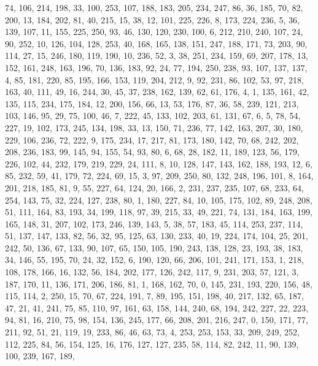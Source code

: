 \begin{DoxyCode}
       74, 106, 214, 198, 33, 100, 253, 107, 188, 183, 205, 234, 247, 86, 36, 185, 70, 82, 200, 13, 184, 202, 81, 40,
       215, 15, 38, 12, 101, 225, 226, 8, 173, 224, 236, 5, 36, 139, 107, 11, 155, 225, 250, 93, 46, 130, 120,
       230, 100, 6, 212, 210, 240, 107, 24, 90, 252, 10, 126, 104, 128, 253, 40, 168, 165, 138, 151, 247, 188, 171,
       73, 203, 90, 114, 27, 15, 246, 180, 119, 190, 10, 236, 52, 3, 38, 251, 234, 159, 69, 207, 178, 13, 152, 161,
       248, 163, 196, 70, 136, 183, 92, 24, 77, 194, 250, 238, 93, 107, 137, 137, 4, 85, 181, 220, 85, 195, 166,
       153, 119, 204, 212, 9, 92, 231, 86, 102, 53, 97, 218, 163, 40, 111, 49, 16, 244, 30, 45, 37, 238, 162, 139, 62,
       61, 176, 4, 1, 135, 161, 42, 135, 115, 234, 175, 184, 12, 200, 156, 66, 13, 53, 176, 87, 36, 58, 239, 121,
       213, 103, 146, 95, 29, 75, 100, 46, 7, 222, 45, 133, 102, 203, 61, 131, 67, 6, 5, 78, 54, 227, 19, 102, 173,
       245, 134, 198, 33, 13, 150, 71, 236, 77, 142, 163, 207, 30, 180, 229, 106, 236, 72, 222, 9, 175, 234, 17,
       217, 81, 173, 180, 142, 70, 68, 242, 202, 208, 236, 183, 99, 145, 94, 155, 54, 93, 80, 6, 68, 28, 182, 11,
       189, 123, 56, 179, 226, 102, 44, 232, 179, 219, 229, 24, 111, 8, 10, 128, 147, 143, 162, 188, 193, 12, 6, 85,
       232, 59, 41, 179, 72, 224, 69, 15, 3, 97, 209, 250, 80, 132, 248, 196, 101, 8, 164, 201, 218, 185, 81, 9,
       55, 227, 64, 124, 20, 166, 2, 231, 237, 235, 107, 68, 233, 64, 254, 143, 75, 32, 224, 127, 238, 80, 1, 180,
       227, 84, 10, 105, 175, 102, 89, 248, 208, 51, 111, 164, 83, 193, 34, 199, 118, 97, 39, 215, 33, 49, 221, 74,
       131, 184, 163, 199, 165, 148, 31, 207, 102, 173, 246, 139, 143, 5, 38, 57, 183, 45, 114, 253, 237, 114, 51,
       137, 147, 133, 82, 56, 32, 95, 125, 63, 130, 233, 40, 19, 224, 174, 104, 25, 201, 242, 50, 136, 67, 133, 90,
       107, 65, 150, 105, 190, 243, 138, 128, 23, 193, 38, 183, 34, 146, 55, 195, 70, 24, 32, 152, 6, 190, 120, 66,
       206, 101, 241, 171, 153, 1, 218, 108, 178, 166, 16, 132, 56, 184, 202, 177, 126, 242, 117, 9, 231, 203, 57,
       121, 3, 187, 170, 11, 136, 171, 206, 186, 81, 1, 168, 162, 70, 0, 145, 231, 193, 220, 156, 48, 115, 114, 2,
       250, 15, 70, 67, 224, 191, 7, 89, 195, 151, 198, 40, 217, 132, 65, 187, 47, 21, 41, 241, 75, 85, 110, 97,
       161, 63, 158, 144, 240, 68, 194, 242, 227, 22, 223, 94, 81, 16, 210, 75, 98, 154, 136, 245, 177, 66, 208,
       201, 216, 247, 0, 150, 171, 77, 211, 92, 51, 21, 119, 19, 233, 86, 46, 63, 73, 4, 253, 253, 153, 33, 209, 249,
       252, 112, 225, 84, 56, 154, 125, 16, 176, 127, 127, 235, 58, 114, 82, 242, 11, 90, 139, 100, 239, 167, 189,

\end{DoxyCode}
